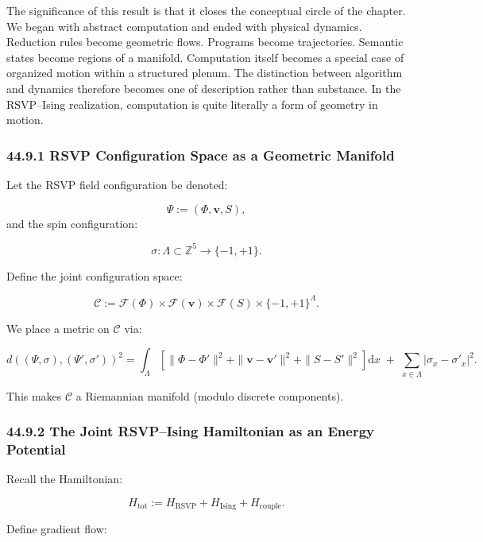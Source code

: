 \documentclass[12pt,letterpaper]{article}
\theoremstyle{remark}
\begin{document}
The significance of this result is that it closes the conceptual circle of the chapter. We began with abstract computation and ended with physical dynamics. Reduction rules become geometric flows. Programs become trajectories. Semantic states become regions of a manifold. Computation itself becomes a special case of organized motion within a structured plenum. The distinction between algorithm and dynamics therefore becomes one of description rather than substance. In the RSVP--Ising realization, computation is quite literally a form of geometry in motion.

\subsubsection{44.9.1 RSVP Configuration Space as a Geometric Manifold}

Let the RSVP field configuration be denoted:

\[
\Psi := (\Phi, \mathbf{v}, S),
\]
and the spin configuration:

\[
\sigma : \Lambda \subset \mathbb{Z}^5 \to \{-1, +1\}.
\]

Define the joint configuration space:

\[
\mathcal{C} := \mathcal{F}(\Phi) \times \mathcal{F}(\mathbf{v}) \times \mathcal{F}(S) \times \{-1,+1\}^{\Lambda}.
\]

We place a metric on $\mathcal{C}$ via:

\[
d((\Psi,\sigma), (\Psi',\sigma'))^2 =
\int_{\Lambda}
\left[
\|\Phi-\Phi'\|^2 + \|\mathbf{v}-\mathbf{v}'\|^2 + \|S-S'\|^2
\right] \mathrm{d}x
\;+\;
\sum_{x \in \Lambda} |\sigma_x - \sigma'_x|^2.
\]

This makes $\mathcal{C}$ a Riemannian manifold (modulo discrete components).

\subsubsection{44.9.2 The Joint RSVP–Ising Hamiltonian as an Energy Potential}

Recall the Hamiltonian:

\[
H_{\text{tot}} := H_{\text{RSVP}} + H_{\text{Ising}} + H_{\text{couple}}.
\]

Define gradient flow:
\end{document}
